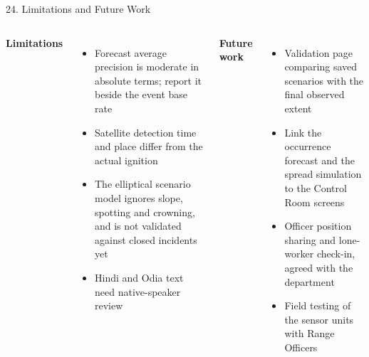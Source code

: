 \begin{frame}{24. Limitations and Future Work}
\scriptsize
\begin{columns}[T,onlytextwidth]
    \textbf{\textcolor{amritaMaroon}{Limitations}}
    \begin{itemize}\setlength\itemsep{2pt}
        \item Forecast average precision is moderate in absolute terms; report it beside the event base rate
        \item Satellite detection time and place differ from the actual ignition
        \item The elliptical scenario model ignores slope, spotting and crowning, and is not validated against closed incidents yet
        \item Hindi and Odia text need native-speaker review
    \end{itemize}
    \textbf{\textcolor{amritaMaroon}{Future work}}
    \begin{itemize}\setlength\itemsep{2pt}
        \item Validation page comparing saved scenarios with the final observed extent
        \item Link the occurrence forecast and the spread simulation to the Control Room screens
        \item Officer position sharing and lone-worker check-in, agreed with the department
        \item Field testing of the sensor units with Range Officers
    \end{itemize}
\end{columns}
\end{frame}

